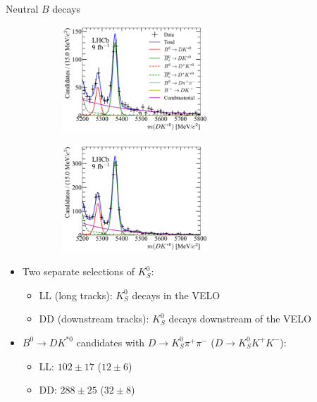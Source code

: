 \documentclass{beamer}
\begin{document}
\begin{frame}{Neutral $B$ decays}
  \begin{figure}
    \begin{subfigure}{0.45\textwidth}
      \includegraphics[height = 4.0cm]{Plots/Kspp_LL_GF_B0toDKst.pdf}
    \end{subfigure}%
    \begin{subfigure}{0.45\textwidth}
      \includegraphics[height = 4.0cm]{Plots/Kspp_DD_GF_B0toDKst.pdf}
    \end{subfigure}
  \end{figure}
  \begin{itemize}
    \setlength\itemsep{0.5em}
    \item{Two separate selections of $K^0_S$:}
    \begin{itemize}
      \item{LL (long tracks): $K^0_S$ decays in the VELO}
      \item{DD (downstream tracks): $K^0_S$ decays downstream of the VELO}
    \end{itemize}
    \item{$B^0\to DK^{*0}$ candidates with $D\to K_S^0\pi^+\pi^-$ ($D\to K_S^0K^+K^-$):}
    \begin{itemize}
      \item{LL: $102 \pm 17$ ($12 \pm 6$)}
      \item{DD: $288 \pm 25$ ($32 \pm 8$)}
    \end{itemize}
  \end{itemize}
\end{frame}
\end{document}
